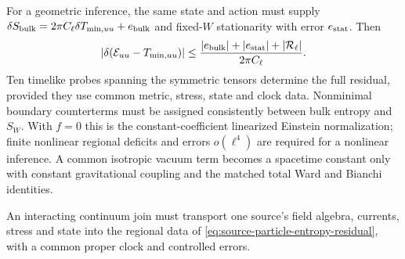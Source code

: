 For a geometric inference, the same state and action must supply
$\delta S_{\rm bulk}=2\pi C_\ell\delta T_{{\rm min},uu}+e_{\rm bulk}$
and fixed-$W$ stationarity with error $e_{\rm stat}$. Then
\begin{equation}
 |\delta(\mathcal E_{uu}-T_{{\rm min},uu})|
 \leq\frac{|e_{\rm bulk}|+|e_{\rm stat}|+|\mathcal R_\ell|}
               {2\pi C_\ell}.
 \label{eq:source-particle-entropy-residual}
\end{equation}
Ten timelike probes spanning the symmetric tensors determine the full
residual, provided they use common metric, stress, state and clock data.
Nonminimal boundary counterterms must be assigned consistently between
bulk entropy and $S_W$. With $f=0$ this is the constant-coefficient
linearized Einstein normalization; finite nonlinear regional deficits
and errors $o(\ell^4)$ are required for a nonlinear inference. A common
isotropic vacuum term becomes a spacetime constant only with constant
gravitational coupling and the matched total Ward and Bianchi identities.

An interacting continuum join must transport one source's field algebra,
currents, stress and state into the regional data of
\eqref{eq:source-particle-entropy-residual}, with a common proper clock and
controlled errors.
